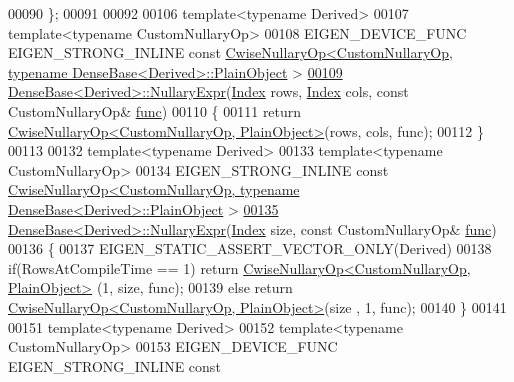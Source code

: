 \begin{DoxyCode}
00090 \};
00091 
00092 
00106 \textcolor{keyword}{template}<\textcolor{keyword}{typename} Derived>
00107 \textcolor{keyword}{template}<\textcolor{keyword}{typename} CustomNullaryOp>
00108 EIGEN\_DEVICE\_FUNC EIGEN\_STRONG\_INLINE \textcolor{keyword}{const} 
      \hyperlink{group___core___module_class_eigen_1_1_cwise_nullary_op}{CwiseNullaryOp<CustomNullaryOp, typename DenseBase<Derived>::PlainObject}
      >
\hyperlink{group___core___module_ace7d7f3237fde5e1a5c82d36c93685be}{00109} \hyperlink{group___core___module_class_eigen_1_1_dense_base}{DenseBase<Derived>::NullaryExpr}(\hyperlink{namespace_eigen_a62e77e0933482dafde8fe197d9a2cfde}{Index} rows, 
      \hyperlink{namespace_eigen_a62e77e0933482dafde8fe197d9a2cfde}{Index} cols, \textcolor{keyword}{const} CustomNullaryOp& \hyperlink{structfunc}{func})
00110 \{
00111   \textcolor{keywordflow}{return} \hyperlink{group___core___module_class_eigen_1_1_cwise_nullary_op}{CwiseNullaryOp<CustomNullaryOp, PlainObject>}(rows, 
      cols, func);
00112 \}
00113 
00132 \textcolor{keyword}{template}<\textcolor{keyword}{typename} Derived>
00133 \textcolor{keyword}{template}<\textcolor{keyword}{typename} CustomNullaryOp>
00134 EIGEN\_STRONG\_INLINE \textcolor{keyword}{const} 
      \hyperlink{group___core___module_class_eigen_1_1_cwise_nullary_op}{CwiseNullaryOp<CustomNullaryOp, typename DenseBase<Derived>::PlainObject}
      >
\hyperlink{group___core___module_a61760d24b08fc51f170e93c3428b50bf}{00135} \hyperlink{group___core___module_class_eigen_1_1_dense_base}{DenseBase<Derived>::NullaryExpr}(\hyperlink{namespace_eigen_a62e77e0933482dafde8fe197d9a2cfde}{Index} size, \textcolor{keyword}{const} CustomNullaryOp& 
      \hyperlink{structfunc}{func})
00136 \{
00137   EIGEN\_STATIC\_ASSERT\_VECTOR\_ONLY(Derived)
00138   \textcolor{keywordflow}{if}(RowsAtCompileTime == 1) \textcolor{keywordflow}{return} \hyperlink{group___core___module_class_eigen_1_1_cwise_nullary_op}{CwiseNullaryOp<CustomNullaryOp, PlainObject>}
      (1, size, func);
00139   \textcolor{keywordflow}{else} \textcolor{keywordflow}{return} \hyperlink{group___core___module_class_eigen_1_1_cwise_nullary_op}{CwiseNullaryOp<CustomNullaryOp, PlainObject>}(size
      , 1, func);
00140 \}
00141 
00151 \textcolor{keyword}{template}<\textcolor{keyword}{typename} Derived>
00152 \textcolor{keyword}{template}<\textcolor{keyword}{typename} CustomNullaryOp>
00153 EIGEN\_DEVICE\_FUNC EIGEN\_STRONG\_INLINE \textcolor{keyword}{const} 

\end{DoxyCode}
